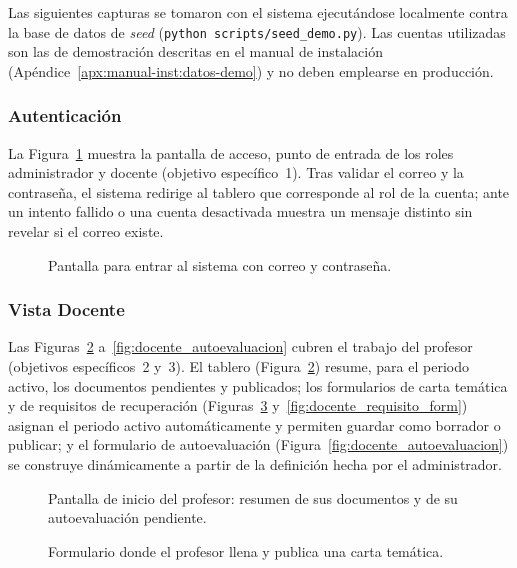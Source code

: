 Las siguientes capturas se tomaron con el sistema ejecutándose localmente contra la base de datos de \emph{seed} (\texttt{python scripts/seed\_demo.py}). Las cuentas utilizadas son las de demostración descritas en el manual de instalación (Apéndice~\ref{apx:manual-inst:datos-demo}) y no deben emplearse en producción.

\subsubsection{Autenticación}

La Figura~\ref{fig:login} muestra la pantalla de acceso, punto de entrada de los roles administrador y docente (objetivo específico~1). Tras validar el correo y la contraseña, el sistema redirige al tablero que corresponde al rol de la cuenta; ante un intento fallido o una cuenta desactivada muestra un mensaje distinto sin revelar si el correo existe.

\begin{figure}[!htbp]
    \centering
    \caption{Pantalla para entrar al sistema con correo y contraseña.}
    \label{fig:login}
\end{figure}

\subsubsection{Vista Docente}

Las Figuras~\ref{fig:docente_dashboard} a~\ref{fig:docente_autoevaluacion} cubren el trabajo del profesor (objetivos específicos~2 y~3). El tablero (Figura~\ref{fig:docente_dashboard}) resume, para el periodo activo, los documentos pendientes y publicados; los formularios de carta temática y de requisitos de recuperación (Figuras~\ref{fig:docente_carta_form} y~\ref{fig:docente_requisito_form}) asignan el periodo activo automáticamente y permiten guardar como borrador o publicar; y el formulario de autoevaluación (Figura~\ref{fig:docente_autoevaluacion}) se construye dinámicamente a partir de la definición hecha por el administrador.

\begin{figure}[!htbp]
    \centering
    \caption{Pantalla de inicio del profesor: resumen de sus documentos y de su autoevaluación pendiente.}
    \label{fig:docente_dashboard}
\end{figure}

\begin{figure}[!htbp]
    \centering
    \caption{Formulario donde el profesor llena y publica una carta temática.}
    \label{fig:docente_carta_form}
\end{figure}

